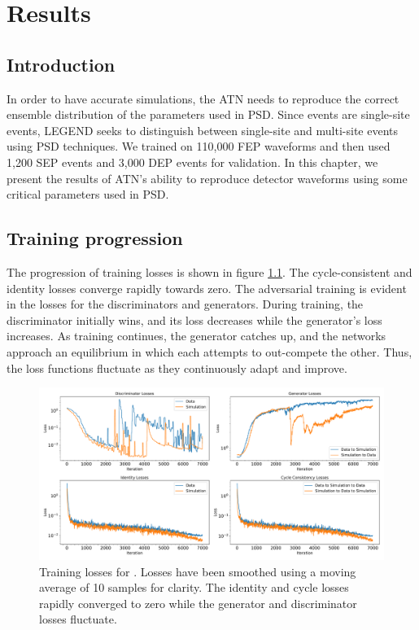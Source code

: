 \chapter{{\cpunet} Results}\label{chap:cpu_net_result}

\section{Introduction}
In order to have accurate simulations, the ATN needs to reproduce the correct ensemble distribution of the parameters used in PSD. Since {\onbb} events are single-site events, LEGEND seeks to distinguish between single-site and multi-site events using PSD techniques. We trained {\cpunet} on 110,000 FEP waveforms and then used 1,200 SEP events and 3,000 DEP events for validation. In this chapter, we present the results of ATN's ability to reproduce detector waveforms using some critical parameters used in PSD. 

\section{Training progression}
The progression of training losses is shown in figure \ref{fig:training_loss}. The cycle-consistent and identity losses converge rapidly towards zero. The adversarial training is evident in the losses for the discriminators and generators. During training, the discriminator initially wins, and its loss decreases while the generator's loss increases. As training continues, the generator catches up, and the networks approach an equilibrium in which each attempts to out-compete the other. Thus, the loss functions fluctuate as they continuously adapt and improve.

\begin{figure}%
    \includegraphics[width=\linewidth,trim={0.5cm 0pc 0.5cm 0pc},clip]{ch8/figs/loss_funcs.pdf}
    \caption{Training losses for {\cpunet}. Losses have been smoothed using a moving average of 10 samples for clarity. The identity and cycle losses rapidly converged to zero while the generator and discriminator losses fluctuate.} 
   \label{fig:training_loss}
\end{figure}


